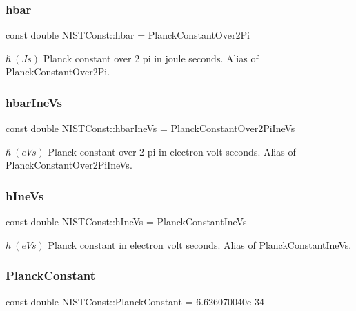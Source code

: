 \subsubsection{\texorpdfstring{hbar}{hbar}}
{\footnotesize\ttfamily const double N\+I\+S\+T\+Const\+::hbar = Planck\+Constant\+Over2\+Pi}

$\hbar \ (J s)$ Planck constant over 2 pi in joule seconds. Alias of Planck\+Constant\+Over2\+Pi. \mbox{\label{group___planck_constant_gacbb39d7d0090ed14cb725a1d6eaa3fd3}} 
\subsubsection{\texorpdfstring{hbar\+Ine\+Vs}{hbarIneVs}}
{\footnotesize\ttfamily const double N\+I\+S\+T\+Const\+::hbar\+Ine\+Vs = Planck\+Constant\+Over2\+Pi\+Ine\+Vs}

$\hbar \ (eV s)$ Planck constant over 2 pi in electron volt seconds. Alias of Planck\+Constant\+Over2\+Pi\+Ine\+Vs. \mbox{\label{group___planck_constant_gabdd6f21b3e5325e4df4a021ee6b6a506}} 
\subsubsection{\texorpdfstring{h\+Ine\+Vs}{hIneVs}}
{\footnotesize\ttfamily const double N\+I\+S\+T\+Const\+::h\+Ine\+Vs = Planck\+Constant\+Ine\+Vs}

$h \ (eV s)$ Planck constant in electron volt seconds. Alias of Planck\+Constant\+Ine\+Vs. \mbox{\label{group___planck_constant_ga6caa482b17de2f08f423eff1a521b0d7}} 
\subsubsection{\texorpdfstring{Planck\+Constant}{PlanckConstant}}
{\footnotesize\ttfamily const double N\+I\+S\+T\+Const\+::\+Planck\+Constant = 6.\+626070040e-\/34}

